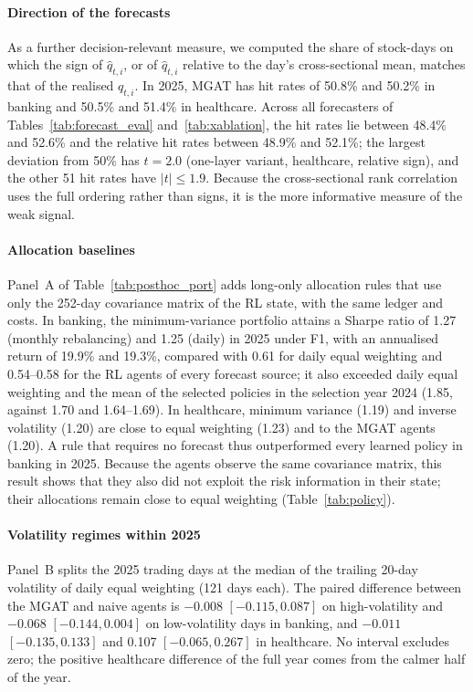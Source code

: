 \documentclass[pdflatex,sn-mathphys-num]{sn-jnl}%
\theoremstyle{thmstyleone}%
\theoremstyle{thmstyletwo}%
\theoremstyle{thmstylethree}%
\begin{document}
{\paragraph{Direction of the forecasts}
As a further decision-relevant measure, we computed the share of stock-days on which the sign of $\hat q_{t,i}$, or of $\hat q_{t,i}$ relative to the day's cross-sectional mean, matches that of the realised $q_{t,i}$. In 2025, MGAT has hit rates of 50.8\% and 50.2\% in banking and 50.5\% and 51.4\% in healthcare. Across all forecasters of Tables~\ref{tab:forecast_eval} and~\ref{tab:xablation}, the hit rates lie between 48.4\% and 52.6\% and the relative hit rates between 48.9\% and 52.1\%; the largest deviation from 50\% has $t=2.0$ (one-layer variant, healthcare, relative sign), and the other 51 hit rates have $|t|\le1.9$. Because the cross-sectional rank correlation uses the full ordering rather than signs, it is the more informative measure of the weak signal.

\paragraph{Allocation baselines}
Panel~A of Table~\ref{tab:posthoc_port} adds long-only allocation rules that use only the 252-day covariance matrix of the RL state, with the same ledger and costs. In banking, the minimum-variance portfolio attains a Sharpe ratio of 1.27 (monthly rebalancing) and 1.25 (daily) in 2025 under F1, with an annualised return of 19.9\% and 19.3\%, compared with 0.61 for daily equal weighting and 0.54--0.58 for the RL agents of every forecast source; it also exceeded daily equal weighting and the mean of the selected policies in the selection year 2024 (1.85, against 1.70 and 1.64--1.69). In healthcare, minimum variance (1.19) and inverse volatility (1.20) are close to equal weighting (1.23) and to the MGAT agents (1.20). A rule that requires no forecast thus outperformed every learned policy in banking in 2025. Because the agents observe the same covariance matrix, this result shows that they also did not exploit the risk information in their state; their allocations remain close to equal weighting (Table~\ref{tab:policy}).

\paragraph{Volatility regimes within 2025}
Panel~B splits the 2025 trading days at the median of the trailing 20-day volatility of daily equal weighting (121 days each). The paired difference between the MGAT and naive agents is $-0.008$ $[-0.115, 0.087]$ on high-volatility and $-0.068$ $[-0.144, 0.004]$ on low-volatility days in banking, and $-0.011$ $[-0.135, 0.133]$ and 0.107 $[-0.065, 0.267]$ in healthcare. No interval excludes zero; the positive healthcare difference of the full year comes from the calmer half of the year.

}
\end{document}
